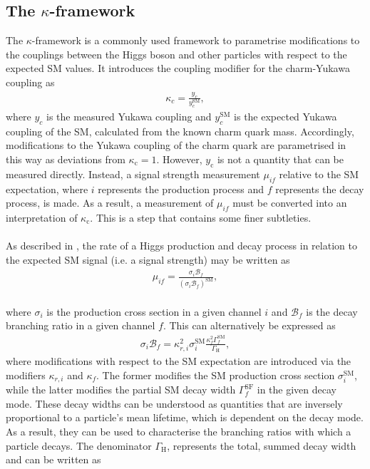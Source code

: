 \subsection{The $\kappa$-framework}
\label{sec:kappaframework}
The $\kappa$-framework \cite{HiggsHandBook} is a commonly used framework to parametrise modifications to the couplings between the Higgs boson and other particles with respect to the expected SM values. It introduces the coupling modifier for the charm-Yukawa coupling as
\begin{align}
    \kappa_{c} = \frac{y_{c}}{y_{c}^{\mathrm{SM}}},
\end{align}
where $y_{c}$ is the measured Yukawa coupling and $y_{c}^{\mathrm{SM}}$ is the expected Yukawa coupling of the SM, calculated from the known charm quark mass. Accordingly, modifications to the Yukawa coupling of the charm quark are parametrised in this way as deviations from $\kappa_{\mathrm{c}} = 1$. However, $y_{\mathrm{c}}$ is not a quantity that can be measured directly. Instead, a signal strength measurement $\mu_{if}$ relative to the SM expectation, where $i$ represents the production process and $f$ represents the decay process, is made. As a result, a measurement of $\mu_{if}$ must be converted into an interpretation of $\kappa_{\mathrm{c}}$. This is a step that contains some finer subtleties. \\
\\
As described in \cite{PhysRevD.100.073013}, the rate of a Higgs production and decay process in relation to the expected SM signal (i.e. a signal strength) may be written as
\begin{align}
    \mu_{if} = \frac{\sigma_i \mathcal{B}_f}{(\sigma_i \mathcal{B}_f)^{\mathrm{SM}}}, \label{RateExpression}
\end{align}
\\
where $\sigma_i$ is the production cross section in a given channel $i$ and $\mathcal{B}_f$ is the decay branching ratio in a given channel $f$. This can alternatively be expressed as 
\begin{align}
    \sigma_i \mathcal{B}_f = \kappa_{r, i}^2 \sigma_i^{\mathrm{SM}} \frac{\kappa_f^2 \Gamma_f^{\mathrm{SM}}}{\Gamma_{\mathrm{H}}},
\end{align}
where modifications with respect to the SM expectation are introduced via the modifiers $\kappa_{r, i}$ and $\kappa_f$. The former modifies the SM production cross section $ \sigma_i^{\mathrm{SM}}$, while the latter modifies the partial SM decay width $\Gamma_f^{\mathrm{SF}}$ in the given decay mode. These decay widths can be understood as quantities that are inversely proportional to a particle's mean lifetime, which is dependent on the decay mode. As a result, they can be used to characterise the branching ratios with which a particle decays. The denominator $\Gamma_{\mathrm{H}}$, represents the total, summed decay width and can be written as
